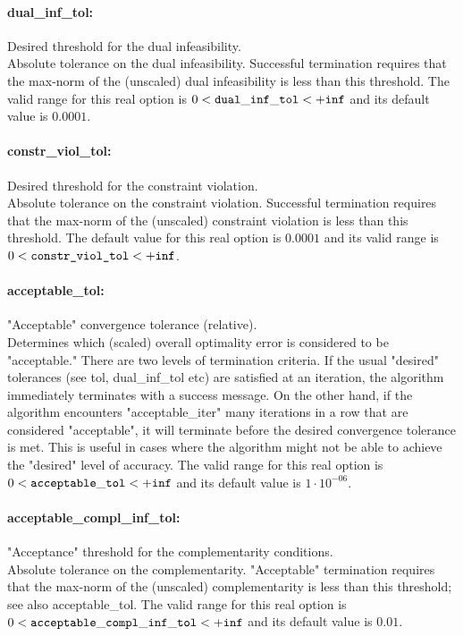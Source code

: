 \paragraph{dual\_inf\_tol:} Desired threshold for the dual infeasibility. $\;$ \\
 Absolute tolerance on the dual infeasibility.
Successful termination requires that the max-norm
of the (unscaled) dual infeasibility is less than
this threshold. The valid range for this real option is 
$0 <  {\tt dual\_inf\_tol } <  {\tt +inf}$
and its default value is $0.0001$.


\paragraph{constr\_viol\_tol:} Desired threshold for the constraint violation. $\;$ \\
 Absolute tolerance on the constraint violation.
Successful termination requires that the max-norm
of the (unscaled) constraint violation is less
than this threshold. The default value for this real option is $0.0001$ and its
valid range is $0<\texttt{constr\_viol\_tol}<{\tt +inf}$.


\paragraph{acceptable\_tol:} "Acceptable" convergence tolerance (relative). $\;$ \\
 Determines which (scaled) overall optimality
error is considered to be "acceptable." There are
two levels of termination criteria.  If the usual
"desired" tolerances (see tol, dual\_inf\_tol
etc) are satisfied at an iteration, the algorithm
immediately terminates with a success message. 
On the other hand, if the algorithm encounters
"acceptable\_iter" many iterations in a row that
are considered "acceptable", it will terminate
before the desired convergence tolerance is met.
This is useful in cases where the algorithm might
not be able to achieve the "desired" level of
accuracy. The valid range for this real option is 
$0 <  {\tt acceptable\_tol } <  {\tt +inf}$
and its default value is $1 \cdot 10^{-06}$.


\paragraph{acceptable\_compl\_inf\_tol:} "Acceptance" threshold for the complementarity conditions. $\;$ \\
 Absolute tolerance on the complementarity.
"Acceptable" termination requires that the
max-norm of the (unscaled) complementarity is
less than this threshold; see also
acceptable\_tol. The valid range for this real option is 
$0 <  {\tt acceptable\_compl\_inf\_tol } <  {\tt +inf}$
and its default value is $0.01$.


